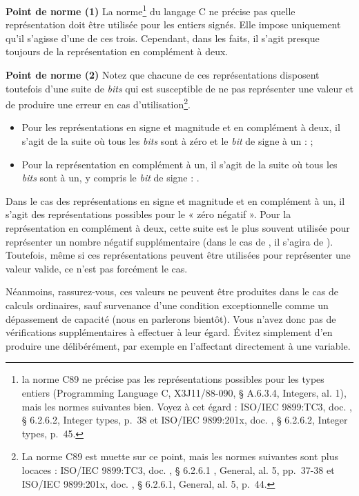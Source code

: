 \begin{infobox}
  \textbf{Point de norme (1)}
  La norme\footnote{\footnotesize{la norme C89 ne précise pas les
  représentations possibles pour les types entiers (Programming Language
  C, X3J11/88-090, § A.6.3.4, Integers, al. 1), mais les normes
  suivantes bien. Voyez à cet égard : ISO/IEC 9899:TC3, doc.
  , §
  6.2.6.2, Integer types, p.~38 et ISO/IEC 9899:201x, doc.
  , §
  6.2.6.2, Integer types, p.~45.}} du langage C ne précise pas quelle
  représentation doit être utilisée pour les entiers signés. Elle impose
  uniquement qu'il s'agisse d'une de ces trois. Cependant, dans les faits,
  il s'agit presque toujours de la représentation en complément à deux.
\end{infobox}


\begin{erreurbox}
  \textbf{Point de norme (2)}
  Notez que chacune de ces représentations disposent toutefois
d'une suite de \emph{bits} qui est susceptible de ne pas représenter une
valeur et de produire une erreur en cas d'utilisation\footnote{\footnotesize{La norme
  C89 est muette sur ce point, mais les normes suivantes sont plus
  locaces : ISO/IEC 9899:TC3, doc.
  , §
  6.2.6.1 , General, al. 5, pp.~37-38 et ISO/IEC 9899:201x, doc.
  , §
  6.2.6.1, General, al. 5, p.~44.}}.
  \begin{itemize}
    \item 
      Pour les représentations en signe et magnitude et en complément à deux, il s'agit
      de la suite où tous les \emph{bits} sont à zéro et le \emph{bit} de
      signe à un :  ; 
     \item 
	Pour la représentation en complément à un, il s'agit de la suite où tous les \emph{bits} sont à
	un, y compris le \emph{bit} de signe : .
  \end{itemize}

Dans le cas des représentations en signe et magnitude et en
complément à un, il s'agit des représentations possibles pour le « zéro
négatif ». Pour la représentation en complément à deux, cette suite est
le plus souvent utilisée pour représenter un nombre négatif
supplémentaire (dans le cas de , il s'agira de
). Toutefois, même si ces représentations peuvent être
utilisées pour représenter une valeur valide, ce n'est pas forcément le
cas.

Néanmoins, rassurez-vous, ces valeurs ne peuvent être produites dans le cas 
de calculs ordinaires, sauf survenance d'une condition exceptionnelle comme 
un dépassement de capacité (nous en parlerons bientôt). Vous n'avez donc pas 
de vérifications supplémentaires à effectuer à leur égard. Évitez
simplement d'en produire une délibérément, par exemple en l'affectant
directement à une variable.
\end{erreurbox}


